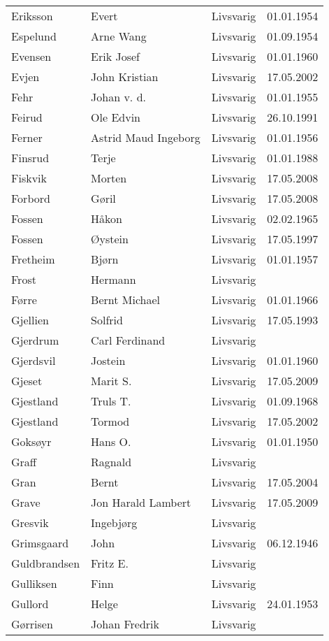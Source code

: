 \begin{longtable}{llll}
Eriksson	&	Evert	&	Livsvarig 	&	01.01.1954	\\
Espelund	&	Arne Wang	&	Livsvarig 	&	01.09.1954	\\
Evensen	&	Erik Josef	&	Livsvarig 	&	01.01.1960	\\
Evjen 	&	John Kristian	&	Livsvarig	&	17.05.2002	\\
Fehr	&	Johan v. d.	&	Livsvarig 	&	01.01.1955	\\
Feirud	&	Ole Edvin	&	Livsvarig 	&	26.10.1991	\\
Ferner	&	Astrid Maud Ingeborg	&	Livsvarig 	&	01.01.1956	\\
Finsrud	&	Terje	&	Livsvarig 	&	01.01.1988	\\
Fiskvik	&	Morten	&	Livsvarig	&	17.05.2008	\\
Forbord	&	Gøril	&	Livsvarig	&	17.05.2008	\\
Fossen	&	Håkon	&	Livsvarig 	&	02.02.1965	\\
Fossen 	&	Øystein	&	Livsvarig	&	17.05.1997	\\
Fretheim	&	Bjørn	&	Livsvarig 	&	01.01.1957	\\
Frost	&	Hermann	&	Livsvarig 	&		\\
Førre	&	Bernt Michael	&	Livsvarig 	&	01.01.1966	\\
Gjellien	&	Solfrid	&	Livsvarig 	&	17.05.1993	\\
Gjerdrum	&	Carl Ferdinand	&	Livsvarig 	&		\\
Gjerdsvil	&	Jostein	&	Livsvarig 	&	01.01.1960	\\
Gjeset	&	Marit S.	&	Livsvarig	&	17.05.2009	\\
Gjestland	&	Truls T. 	&	Livsvarig 	&	01.09.1968	\\
Gjestland 	&	Tormod	&	Livsvarig	&	17.05.2002	\\
Goksøyr	&	Hans O.	&	Livsvarig 	&	01.01.1950	\\
Graff	&	Ragnald	&	Livsvarig 	&		\\
Gran 	&	Bernt	&	Livsvarig	&	17.05.2004	\\
Grave	&	Jon Harald Lambert	&	Livsvarig	&	17.05.2009	\\
Gresvik	&	Ingebjørg	&	Livsvarig 	&		\\
Grimsgaard	&	John	&	Livsvarig 	&	06.12.1946	\\
Guldbrandsen	&	Fritz E. 	&	Livsvarig 	&		\\
Gulliksen	&	Finn	&	Livsvarig 	&		\\
Gullord	&	Helge	&	Livsvarig 	&	24.01.1953	\\
Gørrisen	&	Johan Fredrik	&	Livsvarig 	&		\\

\end{longtable}
